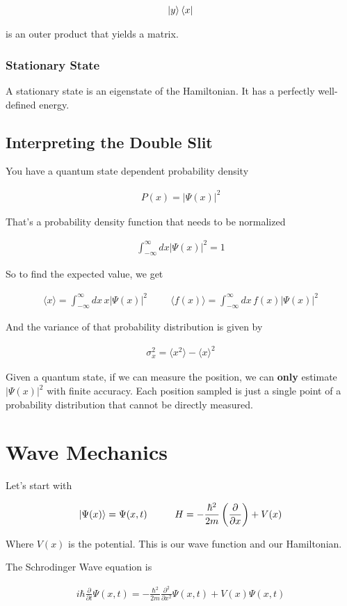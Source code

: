 \documentclass[fleqn]{report}
\newcommand{\hp}{\hspace{1cm}}
\newcommand{\del}{\partial}
\newcommand{\equations} [1] {
\begin{gather*}
#1
\end{gather*}
}
\begin{document}
\equations{
    \ket{y} \bra{x} 
}
is an outer product that yields a matrix.

\subsection{Stationary State}
A stationary state is an eigenstate of the Hamiltonian.
It has a perfectly well-defined energy. 

\section{Interpreting the Double Slit}
You have a quantum state dependent probability density 

\equations{
    P(x)
    =
    |\Psi(x)|^2
}

That's a probability density function that needs to be normalized 

\equations{
    \int^\infty_{-\infty}
    dx |\Psi(x)|^2 
    =
    1
}

So to find the expected value, we get 

\equations{
    \langle x \rangle 
    =
    \int^\infty_{-\infty}
    dx \, 
    x 
    |\Psi(x)|^2 
    \hp
    \langle f(x) \rangle 
    =
    \int^\infty_{-\infty}
    dx \, 
    f(x) 
    |\Psi(x)|^2 
}

And the variance of that probability distribution is given by 
\equations{
    \sigma_x^2 
    =
    \langle x^2 \rangle 
    -
    \langle x \rangle^2
}

Given a quantum state, if we can measure the position, we 
can \textbf{only} estimate $|\Psi(x)|^2$ with finite accuracy. 
Each position sampled is just a single point of a probability distribution 
that cannot be directly measured. 

\chapter{Wave Mechanics}
Let's start with 

\equations{
    \ket{\Psi(x)} 
    =
    \Psi(x, t)
    \hp
    H 
    =
    - \frac{\hbar^2}{2 m}
    \left( \frac{\del}{\del x} \right)
    +
    V(x)
}

Where $V(x)$ is the potential. This is our wave function 
and our Hamiltonian. 

The Schrodinger Wave equation is 
\equations{
    i \hbar \frac{\del}{\del t} \Psi(x, t)
    =
    - \frac{\hbar^2 }{2m} \frac{\del^2}{\del x^2} \Psi(x, t) 
    +
    V(x) \Psi(x, t)
}
\end{document}
